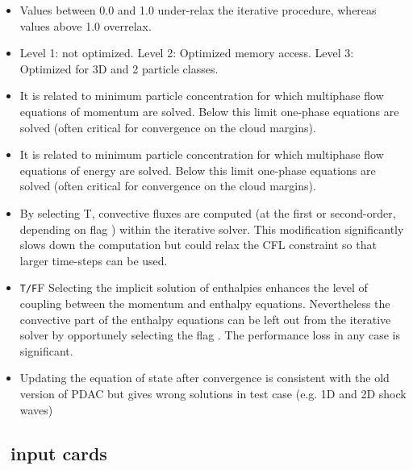 \begin{itemize}
\item
{}
{Values between 0.0 and 1.0 under-relax the iterative procedure, whereas
values above 1.0 overrelax.}

\item
{}
{Level 1: not optimized. Level 2: Optimized memory access. Level 3: Optimized for 3D and 2 particle classes.}

\item
{}
{It is related to minimum particle concentration for which multiphase flow
equations of momentum are solved. Below this limit one-phase equations are solved
(often critical for convergence on the cloud margins).}

\item
{}
{It is related to minimum particle concentration for which multiphase flow
equations of energy are solved. Below this limit one-phase equations are solved
(often critical for convergence on the cloud margins).}

\item
{}
{By selecting T, convective fluxes are computed (at the first or second-order, 
depending on flag ) within the iterative solver. This modification
significantly slows down the computation but could relax the CFL constraint
so that larger time-steps can be used.}

\item
{}
{{\tt T/F}}{F}
{Selecting the implicit solution of enthalpies enhances the level of coupling
between the momentum and enthalpy equations. Nevertheless the convective part 
of the enthalpy equations can be left out from the iterative solver
by opportunely selecting the flag . The performance loss
in any case is significant.}

\item
{}
{Updating the equation of state after convergence is consistent with the old
version of PDAC but gives wrong solutions in test case (e.g. 1D and 2D shock waves)}
\end{itemize}

\subsection{\PDAC\ input cards}
\label{section:cards}


